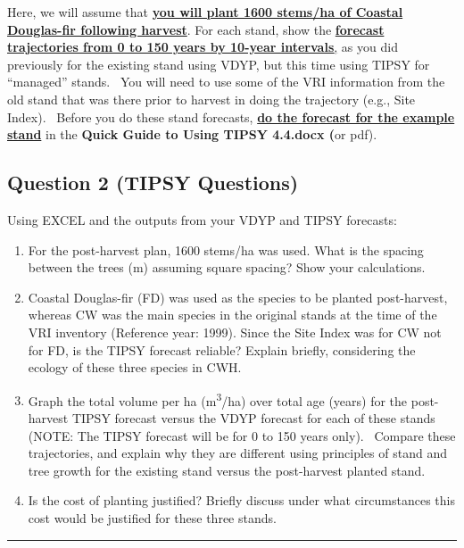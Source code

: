 \documentclass[
  letterpaper,
]{book}
\providecommand{\tightlist}{%
  \setlength{\itemsep}{0pt}\setlength{\parskip}{0pt}}\usepackage{longtable,booktabs,array}
\begin{document}
Here, we will assume that \ul{\textbf{you will plant 1600 stems/ha of
Coastal Douglas-fir following harvest}}. For each stand, show the
\ul{\textbf{forecast trajectories from 0 to 150 years by 10-year
intervals},} as you did previously for the existing stand using VDYP,
but this time using TIPSY for ``managed'' stands.~ You will need to use
some of the VRI information from the old stand that was there prior to
harvest in doing the trajectory (e.g., Site Index).~ Before you do these
stand forecasts, \ul{\textbf{do the forecast for the example stand}} in
the \textbf{Quick Guide to Using TIPSY 4.4.docx (}or pdf).

\hypertarget{question-2-tipsy-questions}{%
\subsection{Question 2 (TIPSY
Questions)}\label{question-2-tipsy-questions}}

Using EXCEL and the outputs from your VDYP and TIPSY forecasts:

\begin{enumerate}
\def\labelenumi{\arabic{enumi}.}
\tightlist
\item
  For the post-harvest plan, 1600 stems/ha was used. What is the spacing
  between the trees (m) assuming square spacing? Show your calculations.
\item
  Coastal Douglas-fir (FD) was used as the species to be planted
  post-harvest, whereas CW was the main species in the original stands
  at the time of the VRI inventory (Reference year: 1999). Since the
  Site Index was for CW not for FD, is the TIPSY forecast reliable?
  Explain briefly, considering the ecology of these three species in
  CWH.
\item
  Graph the total volume per ha (m\textsuperscript{3}/ha) over total age
  (years) for the post-harvest TIPSY forecast versus the VDYP forecast
  for each of these stands (NOTE: The TIPSY forecast will be for 0 to
  150 years only).~ Compare these trajectories, and explain why they are
  different using principles of stand and tree growth for the existing
  stand versus the post-harvest planted stand.
\item
  Is the cost of planting justified? Briefly discuss under what
  circumstances this cost would be justified for these three stands.
\end{enumerate}

\begin{center}\rule{0.5\linewidth}{0.5pt}\end{center}
\end{document}
